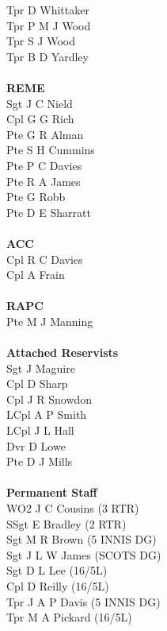 \begin{multicols}{2}
  Tpr D Whittaker \\
  Tpr P M J Wood \\
  Tpr S J Wood \\
  Tpr B D Yardley \\
  \\
  \textbf{REME} \\
  Sgt J C Nield \\
  Cpl G G Rich \\
  Pte G R Alman \\
  Pte S H Cummins \\
  Pte P C Davies \\
  Pte R A James \\
  Pte G Robb \\
  Pte D E Sharratt \\
  \\
  \textbf{ACC} \\
  Cpl R C Davies \\
  Cpl A Frain \\
  \\
  \textbf{RAPC} \\
  Pte M J Manning \\
  \\
  \textbf{Attached Reservists} \\
  Sgt J Maguire \\
  Cpl D Sharp \\
  Cpl J R Snowdon \\
  LCpl A P Smith \\
  LCpl J L Hall \\
  Dvr D Lowe \\
  Pte D J Mills \\
  \\
  \textbf{Permanent Staff} \\
  WO2 J C Cousins (3 RTR) \\
  SSgt E Bradley (2 RTR) \\
  Sgt M R Brown (5 INNIS DG) \\
  Sgt J L W James (SCOTS DG) \\
  Sgt D L Lee (16/5L) \\
  Cpl D Reilly (16/5L) \\
  Tpr J A P Davis (5 INNIS DG) \\
  Tpr M A Pickard (16/5L) \\
\end{multicols}
